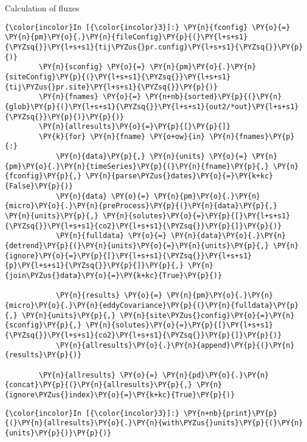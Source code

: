 \begin{block}{Calculation of fluxes}
    \begin{Verbatim}[commandchars=\\\{\}]
{\color{incolor}In [{\color{incolor}3}]:} \PY{n}{fconfig} \PY{o}{=} \PY{n}{pm}\PY{o}{.}\PY{n}{fileConfig}\PY{p}{(}\PY{l+s+s1}{\PYZsq{}}\PY{l+s+s1}{tij\PYZus{}pr.config}\PY{l+s+s1}{\PYZsq{}}\PY{p}{)}
        \PY{n}{sconfig} \PY{o}{=} \PY{n}{pm}\PY{o}{.}\PY{n}{siteConfig}\PY{p}{(}\PY{l+s+s1}{\PYZsq{}}\PY{l+s+s1}{tij\PYZus{}pr.site}\PY{l+s+s1}{\PYZsq{}}\PY{p}{)}
        \PY{n}{fnames} \PY{o}{=} \PY{n+nb}{sorted}\PY{p}{(}\PY{n}{glob}\PY{p}{(}\PY{l+s+s1}{\PYZsq{}}\PY{l+s+s1}{out2/*out}\PY{l+s+s1}{\PYZsq{}}\PY{p}{)}\PY{p}{)}
        \PY{n}{allresults}\PY{o}{=}\PY{p}{[}\PY{p}{]}
        \PY{k}{for} \PY{n}{fname} \PY{o+ow}{in} \PY{n}{fnames}\PY{p}{:}
            \PY{n}{data}\PY{p}{,} \PY{n}{units} \PY{o}{=} \PY{n}{pm}\PY{o}{.}\PY{n}{timeSeries}\PY{p}{(}\PY{n}{fname}\PY{p}{,} \PY{n}{fconfig}\PY{p}{,} \PY{n}{parse\PYZus{}dates}\PY{o}{=}\PY{k+kc}{False}\PY{p}{)}
            \PY{n}{data} \PY{o}{=} \PY{n}{pm}\PY{o}{.}\PY{n}{micro}\PY{o}{.}\PY{n}{preProcess}\PY{p}{(}\PY{n}{data}\PY{p}{,} \PY{n}{units}\PY{p}{,} \PY{n}{solutes}\PY{o}{=}\PY{p}{[}\PY{l+s+s1}{\PYZsq{}}\PY{l+s+s1}{co2}\PY{l+s+s1}{\PYZsq{}}\PY{p}{]}\PY{p}{)}
            \PY{n}{fulldata} \PY{o}{=} \PY{n}{data}\PY{o}{.}\PY{n}{detrend}\PY{p}{(}\PY{n}{units}\PY{o}{=}\PY{n}{units}\PY{p}{,} \PY{n}{ignore}\PY{o}{=}\PY{p}{[}\PY{l+s+s1}{\PYZsq{}}\PY{l+s+s1}{p}\PY{l+s+s1}{\PYZsq{}}\PY{p}{]}\PY{p}{,} \PY{n}{join\PYZus{}data}\PY{o}{=}\PY{k+kc}{True}\PY{p}{)}
        
            \PY{n}{results} \PY{o}{=} \PY{n}{pm}\PY{o}{.}\PY{n}{micro}\PY{o}{.}\PY{n}{eddyCovariance}\PY{p}{(}\PY{n}{fulldata}\PY{p}{,} \PY{n}{units}\PY{p}{,} \PY{n}{site\PYZus{}config}\PY{o}{=}\PY{n}{sconfig}\PY{p}{,} \PY{n}{solutes}\PY{o}{=}\PY{p}{[}\PY{l+s+s1}{\PYZsq{}}\PY{l+s+s1}{co2}\PY{l+s+s1}{\PYZsq{}}\PY{p}{]}\PY{p}{)}
            \PY{n}{allresults}\PY{o}{.}\PY{n}{append}\PY{p}{(}\PY{n}{results}\PY{p}{)}
        
        \PY{n}{allresults} \PY{o}{=} \PY{n}{pd}\PY{o}{.}\PY{n}{concat}\PY{p}{(}\PY{n}{allresults}\PY{p}{,} \PY{n}{ignore\PYZus{}index}\PY{o}{=}\PY{k+kc}{True}\PY{p}{)}
\end{Verbatim}


    \begin{Verbatim}[commandchars=\\\{\}]
{\color{incolor}In [{\color{incolor}3}]:} \PY{n+nb}{print}\PY{p}{(}\PY{n}{allresults}\PY{o}{.}\PY{n}{with\PYZus{}units}\PY{p}{(}\PY{n}{units}\PY{p}{)}\PY{p}{)}
\end{Verbatim}



\end{block}
